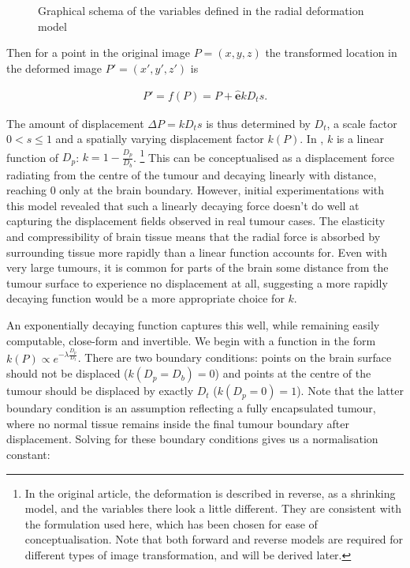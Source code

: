 \begin{figure}[htp]
  \centering
  
  \caption{Graphical schema of the variables defined in the radial deformation model}
  \label{fig:virtue}
\end{figure}

Then for a point in the original image $P = (x,y,z)$ the transformed location in the deformed image $P' = (x',y',z')$ is

\begin{align}\label{eq:forwardP}
  P' = f(P) = P + \mathbf{\hat{e}}kD_ts.
\end{align}

The amount of displacement $\Delta P = kD_ts$ is thus determined by $D_t$, a scale factor $0<s \leq 1$ and a spatially varying displacement factor $k(P)$.
In \textcite{Nowinski2005}, $k$ is a linear function of $D_p$: $k = 1-\frac{D_p}{D_b}$. \footnote[2]{In the original \textcite{Nowinski2005} article, the deformation is described in reverse, as a shrinking model, and the variables there look a little different. They are consistent with the formulation used here, which has been chosen for ease of conceptualisation. Note that both forward and reverse models are required for different types of image transformation, and will be derived later.}
This can be conceptualised as a displacement force radiating from the centre of the tumour and decaying linearly with distance, reaching 0 only at the brain boundary.
However, initial experimentations with this model revealed that such a linearly decaying force doesn't do well at capturing the displacement fields observed in real tumour cases.
The elasticity and compressibility of brain tissue means that the radial force is absorbed by surrounding tissue more rapidly than a linear function accounts for.
Even with very large tumours, it is common for parts of the brain some distance from the tumour surface to experience no displacement at all, suggesting a  more rapidly decaying function would be a more appropriate choice for $k$.

An exponentially decaying function captures this well, while remaining easily computable, close-form and invertible.
We begin with a function in the form $k(P) \propto e^{-\lambda \frac{D_p}{D_t}}$.
There are two boundary conditions: points on the brain surface should not be displaced ($k(D_p = D_b) = 0$) and points at the centre of the tumour should be displaced by exactly $D_t$ ($k(D_p = 0) = 1$).
Note that the latter boundary condition is an assumption reflecting a fully encapsulated tumour, where no normal tissue remains inside the final tumour boundary after displacement.
Solving for these boundary conditions gives us a normalisation constant:

